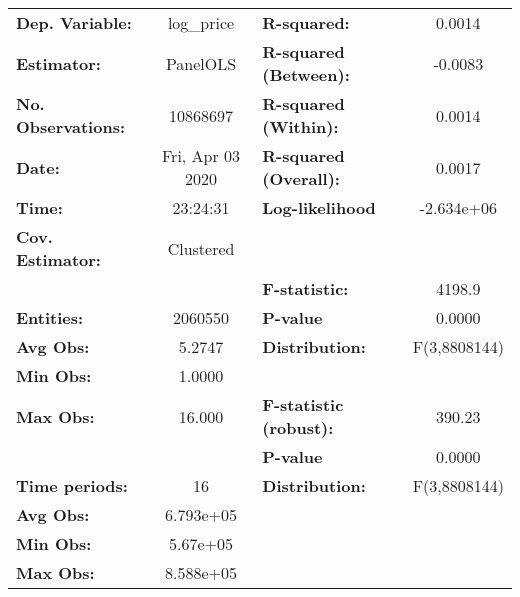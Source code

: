 \documentclass{report}
\begin{document}
\begin{center}
\begin{tabular}{lclc}
\toprule
\textbf{Dep. Variable:}        &     log\_price     & \textbf{  R-squared:         }   &      0.0014      \\
\textbf{Estimator:}            &      PanelOLS      & \textbf{  R-squared (Between):}  &     -0.0083      \\
\textbf{No. Observations:}     &      10868697      & \textbf{  R-squared (Within):}   &      0.0014      \\
\textbf{Date:}                 &  Fri, Apr 03 2020  & \textbf{  R-squared (Overall):}  &      0.0017      \\
\textbf{Time:}                 &      23:24:31      & \textbf{  Log-likelihood     }   &    -2.634e+06    \\
\textbf{Cov. Estimator:}       &     Clustered      & \textbf{                     }   &                  \\
\textbf{}                      &                    & \textbf{  F-statistic:       }   &      4198.9      \\
\textbf{Entities:}             &      2060550       & \textbf{  P-value            }   &      0.0000      \\
\textbf{Avg Obs:}              &       5.2747       & \textbf{  Distribution:      }   &   F(3,8808144)   \\
\textbf{Min Obs:}              &       1.0000       & \textbf{                     }   &                  \\
\textbf{Max Obs:}              &       16.000       & \textbf{  F-statistic (robust):} &      390.23      \\
\textbf{}                      &                    & \textbf{  P-value            }   &      0.0000      \\
\textbf{Time periods:}         &         16         & \textbf{  Distribution:      }   &   F(3,8808144)   \\
\textbf{Avg Obs:}              &     6.793e+05      & \textbf{                     }   &                  \\
\textbf{Min Obs:}              &      5.67e+05      & \textbf{                     }   &                  \\
\textbf{Max Obs:}              &     8.588e+05      & \textbf{                     }   &                  \\
\bottomrule
\end{tabular}
\begin{tabular}{lcccccc}

\end{tabular}
\end{center}
\end{document}
